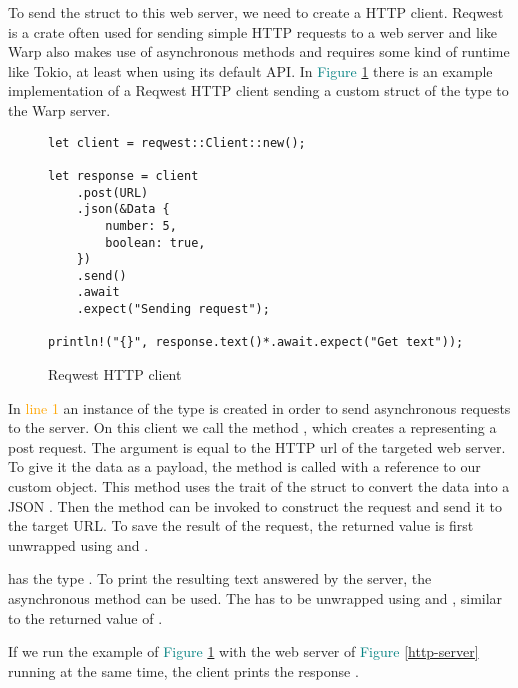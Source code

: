 To send the struct to this web server, we need to create a HTTP client. Reqwest is a crate often used for sending
simple HTTP requests to a web server and like Warp also makes use of asynchronous methods and requires some kind
of runtime like Tokio, at least when using its default API. In \textcolor{teal}{Figure \ref{http-client}} there is an
example implementation of a Reqwest HTTP client sending a custom struct of the type  to the Warp server.

\begin{figure}[ht]
    \begin{verbatim}
let client = reqwest::Client::new();

let response = client
    .post(URL)
    .json(&Data {
        number: 5,
        boolean: true,
    })
    .send()
    .await
    .expect("Sending request");

println!("{}", response.text()*.await.expect("Get text"));
    \end{verbatim}
    \caption{Reqwest HTTP client}
    \label{http-client}
\end{figure}

In \textcolor{orange}{line 1} an instance of the type  is created in order to send asynchronous
requests to the server. On this client we call the method , which creates a 
representing a post request. The argument  is equal to the HTTP url of the targeted web server. To give it
the data as a payload, the method  is called with a reference to our custom  object. This method
uses the  trait of the struct to convert the data into a JSON . Then the 
method can be invoked to construct the request and send it to the target URL. To save the result of the request, the
returned value is first unwrapped using  and .

 has the type . To print the resulting text answered by the server, the
asynchronous method  can be used. The  has to be unwrapped using  and
, similar to the returned value of .

If we run the example of \textcolor{teal}{Figure \ref{http-client}} with the web server of
\textcolor{teal}{Figure \ref{http-server}} running at the same time, the client prints the response
 .
